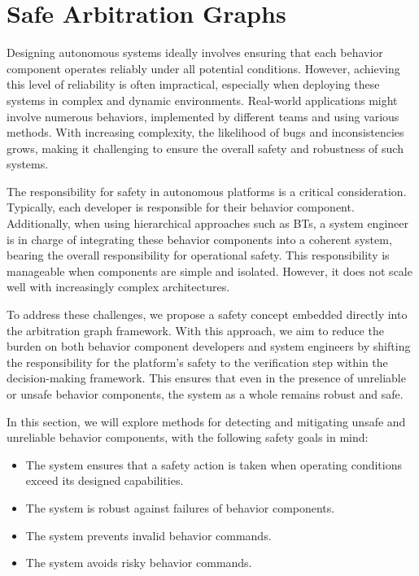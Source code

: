 \section{Safe Arbitration Graphs}

Designing autonomous systems ideally involves ensuring that each behavior component operates reliably under all potential conditions.
However, achieving this level of reliability is often impractical, especially when deploying these systems in complex and dynamic environments.
Real-world applications might involve numerous behaviors, implemented by different teams and using various methods.
With increasing complexity, the likelihood of bugs and inconsistencies grows, making it challenging to ensure the overall safety and robustness of such systems.

The responsibility for safety in autonomous platforms is a critical consideration.
Typically, each developer is responsible for their behavior component.
Additionally, when using hierarchical approaches such as \glspl{BT},
    a system engineer is in charge of integrating these behavior components into a coherent system,
    bearing the overall responsibility for operational safety.
This responsibility is manageable when components are simple and isolated.
However, it does not scale well with increasingly complex architectures.

To address these challenges, we propose a safety concept embedded directly into the arbitration graph framework.
With this approach, we aim to reduce the burden on both behavior component developers and system engineers
by shifting the responsibility for the platform's safety to the verification step within the decision-making framework.
This ensures that even in the presence of unreliable or unsafe behavior components, the system as a whole remains robust and safe.

In this section, we will explore methods for detecting and mitigating unsafe and unreliable behavior components, with the following safety goals in mind:

\begin{itemize}
    \item The system ensures that a safety action is taken when operating conditions exceed its designed capabilities.
    \item The system is robust against failures of behavior components.
    \item The system prevents invalid behavior commands.
    \item The system avoids risky behavior commands.
\end{itemize}

